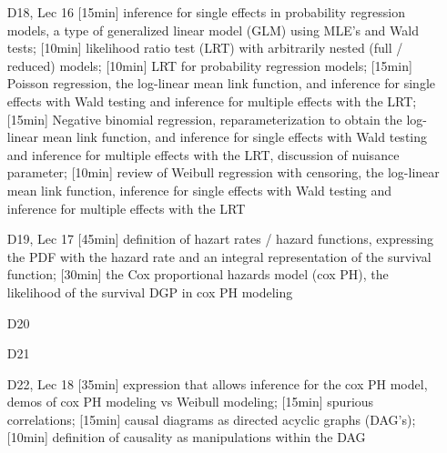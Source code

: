 \begin{enumerate}
\item[D18, Lec 16] [15min] inference for single effects in probability regression models, a type of generalized linear model (GLM) using MLE's and Wald tests; [10min] likelihood ratio test (LRT) with arbitrarily nested (full / reduced) models; [10min] LRT for probability regression models; [15min] Poisson regression, the log-linear mean link function, and inference for single effects with Wald testing and inference for multiple effects with the LRT; [15min] Negative binomial regression, reparameterization to obtain the log-linear mean link function, and inference for single effects with Wald testing and inference for multiple effects with the LRT, discussion of nuisance parameter; [10min] review of Weibull regression with censoring, the log-linear mean link function, inference for single effects with Wald testing and inference for multiple effects with the LRT

\item[D19, Lec 17] [45min] definition of hazart rates / hazard functions, expressing the PDF with the hazard rate and an integral representation of the survival function; [30min] the Cox proportional hazards model (cox PH), the likelihood of the survival DGP in cox PH modeling

\item[D20] 
\item[D21] 

\item[D22, Lec 18] [35min] expression that allows inference for the cox PH model, demos of cox PH modeling vs Weibull modeling; [15min] spurious correlations; [15min] causal diagrams as directed acyclic graphs (DAG's); [10min] definition of causality as manipulations within the DAG






\end{enumerate}

